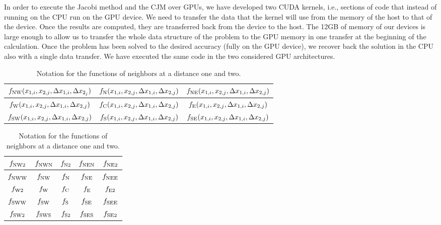\documentclass[preprint,12pt]{elsarticle}
\begin{document}
In order to execute the Jacobi method and the CJM over GPUs, we have
developed two CUDA kernels, i.e., sections of code that instead of
running on the CPU run on the GPU device. We need to transfer the data
that the kernel will use from the memory of the host to that of the
device. Once the results are computed, they are transferred back from
the device to the host. The 12GB of memory of our devices
is large enough to allow us to transfer the whole
data structure of the problem to the GPU memory in one transfer at the beginning
of the calculation. Once the problem has been solved
  to the desired accuracy (fully on the GPU device), we recover
back the solution in the CPU also with a single
data transfer. We have executed
the same code in the two considered GPU architectures.

\begin{table}[p]
\centering

\begin{tabular}{|c|c|c|}
\hline
$f_{\rm NW}(x_{1,i},x_{2,j},\Delta x_{1,i}, \Delta x_{2_j})$ & $f_{\rm N}(x_{1,i},x_{2,j},\Delta x_{1,i}, \Delta x_{2,j})$ & $f_{\rm NE}(x_{1,i},x_{2,j},\Delta x_{1,i}, \Delta x_{2,j})$ \\ \hline
$f_{\rm W}(x_{1,i},x_{2,j},\Delta x_{1,i}, \Delta x_{2,j})$ & $f_{\rm C}(x_{1,i},x_{2,j},\Delta x_{1,i}, \Delta x_{2,j})$ & $f_{\rm E}(x_{1,i},x_{2,j},\Delta x_{1,i}, \Delta x_{2,j})$ \\ \hline
$f_{\rm SW}(x_{1,i},x_{2,j},\Delta x_{1,i}, \Delta x_{2,j})$ & $f_{\rm S}(x_{1,i},x_{2,j},\Delta x_{1,i}, \Delta x_{2,j})$ & $f_{\rm SE}(x_{1,i},x_{2,j},\Delta x_{1,i}, \Delta x_{2,j})$ \\ \hline
\end{tabular}

\vspace{0.5cm}

\begin{tabular}{|c|c|c|c|c|}
\hline
$f_{\rm NW2}$  & $f_{\rm NWN}$ & $f_{\rm N2}$  & $f_{\rm NEN}$ &  $f_{\rm NE2}$ \\ \hline
$f_{\rm NWW}$ & $f_{\rm NW}$   & $f_{\rm N} $   & $f_{\rm NE}$    & $f_{\rm NEE}$ \\ \hline
$f_{\rm W2}$     & $f_{\rm W}$       & $f_{\rm C}$      & $f_{\rm E}$         & $f_{\rm E2}$    \\ \hline
$f_{\rm SWW}$ & $f_{\rm SW}$   & $f_{\rm S}$    & $f_{\rm SE}$    & $f_{\rm SEE}$  \\ \hline
$f_{\rm SW2}$  & $f_{\rm SWS}$ & $f_{\rm S2} $ & $f_{\rm SES}$ & $f_{\rm SE2}$   \\ \hline
\end{tabular}

\vspace{0.5cm}
\caption{Notation for the functions of neighbors at a distance one and two.}
\label{tab:ste1}
\end{table}
\end{document}
